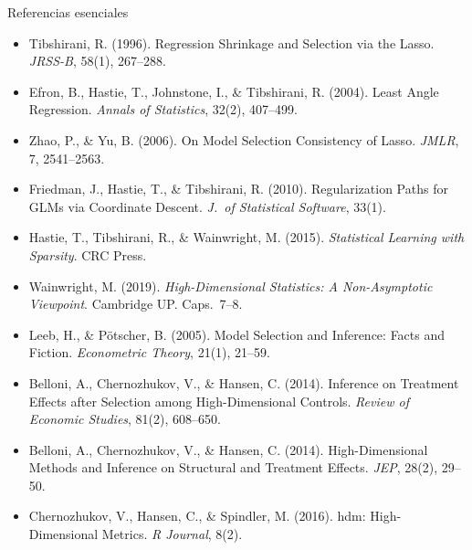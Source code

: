 \documentclass{beamer}
\newcommand{\1}{\mathbb{I}}
\begin{document}
\begin{frame}{Referencias esenciales}
\footnotesize
\begin{itemize}\itemsep2pt
  \item Tibshirani, R. (1996). Regression Shrinkage and Selection via the Lasso. \emph{JRSS-B}, 58(1), 267--288.
  \item Efron, B., Hastie, T., Johnstone, I., \& Tibshirani, R. (2004). Least Angle Regression. \emph{Annals of Statistics}, 32(2), 407--499.
  \item Zhao, P., \& Yu, B. (2006). On Model Selection Consistency of Lasso. \emph{JMLR}, 7, 2541--2563.
  \item Friedman, J., Hastie, T., \& Tibshirani, R. (2010). Regularization Paths for GLMs via Coordinate Descent. \emph{J.\ of Statistical Software}, 33(1).
  \item Hastie, T., Tibshirani, R., \& Wainwright, M. (2015). \emph{Statistical Learning with Sparsity}. CRC Press.
  \item Wainwright, M. (2019). \emph{High-Dimensional Statistics: A Non-Asymptotic Viewpoint}. Cambridge UP. Caps.\ 7--8.
  \item Leeb, H., \& Pötscher, B. (2005). Model Selection and Inference: Facts and Fiction. \emph{Econometric Theory}, 21(1), 21--59.
  \item Belloni, A., Chernozhukov, V., \& Hansen, C. (2014). Inference on Treatment Effects after Selection among High-Dimensional Controls. \emph{Review of Economic Studies}, 81(2), 608--650.
  \item Belloni, A., Chernozhukov, V., \& Hansen, C. (2014). High-Dimensional Methods and Inference on Structural and Treatment Effects. \emph{JEP}, 28(2), 29--50.
  \item Chernozhukov, V., Hansen, C., \& Spindler, M. (2016). hdm: High-Dimensional Metrics. \emph{R Journal}, 8(2).
\end{itemize}
\normalsize
\end{frame}

\end{document}
